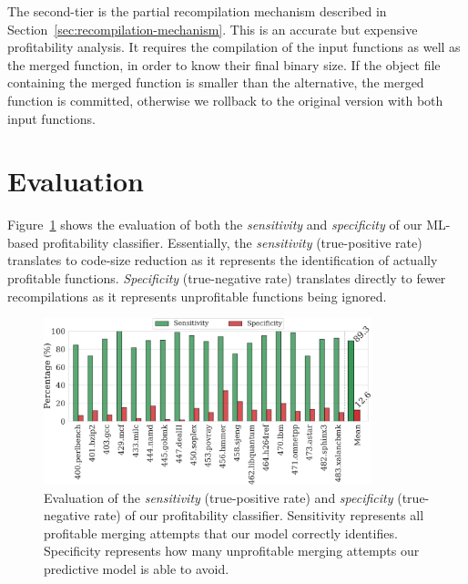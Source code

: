 The second-tier is the partial recompilation mechanism described in Section~\ref{sec:recompilation-mechanism}.
This is an accurate but expensive profitability analysis.
It requires the compilation of the input functions as well as the merged function, in order to know their final binary size.
If the object file containing the merged function is smaller than the alternative, the merged function is committed, otherwise we rollback to the original version with both input functions.

\section{Evaluation}




Figure~\ref{fig:prediction-ss} shows the evaluation of both the \textit{sensitivity} and \textit{specificity} of our ML-based profitability classifier.
Essentially, the \textit{sensitivity} (true-positive rate) translates to code-size reduction as it represents the identification of actually profitable functions. 
\textit{Specificity} (true-negative rate) translates directly to fewer recompilations as it represents unprofitable functions being ignored.

\begin{figure}[h]
  \centering
  \includegraphics[width=0.85\textwidth]{src/deeplearning/figs/prediction-ss.pdf}
  \caption{Evaluation of the \textit{sensitivity} (true-positive rate) and \textit{specificity} (true-negative rate) of our profitability classifier.
  Sensitivity represents all profitable merging attempts that our model correctly identifies. 
  Specificity represents how many unprofitable merging attempts our predictive model is able to avoid.
  }
  \label{fig:prediction-ss}
\end{figure}


